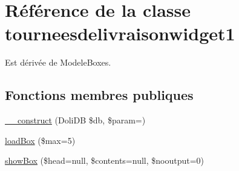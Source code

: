 \hypertarget{classtourneesdelivraisonwidget1}{}\section{Référence de la classe tourneesdelivraisonwidget1}
\label{classtourneesdelivraisonwidget1}


Est dérivée de Modele\+Boxes.

\subsection*{Fonctions membres publiques}
\begin{DoxyCompactItemize}
\item 
\hyperlink{classtourneesdelivraisonwidget1_a7b5080ecafa0c9338fd7934d05ed5d5a}{\+\_\+\+\_\+construct} (Doli\+DB \$db, \$param=\textquotesingle{}\textquotesingle{})
\item 
\hyperlink{classtourneesdelivraisonwidget1_a6c8264b96f0e08ba38cd3e70e25f80fa}{load\+Box} (\$max=5)
\item 
\hyperlink{classtourneesdelivraisonwidget1_a0e81186a6497e01bed0f8ca48864d088}{show\+Box} (\$head=null, \$contents=null, \$nooutput=0)
\end{DoxyCompactItemize}
